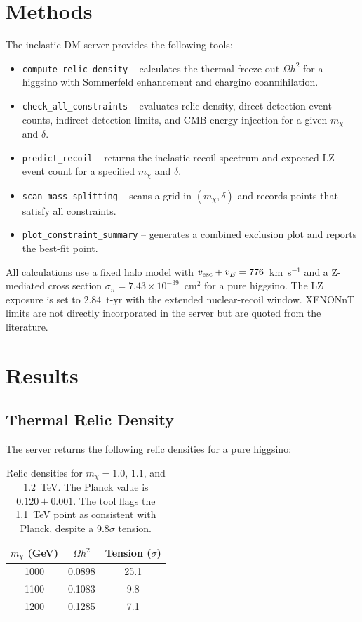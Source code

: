 \documentclass[11pt,a4paper]{article}
\begin{document}
\section{Methods}
The inelastic-DM server provides the following tools:
\begin{itemize}
\item \texttt{compute\_relic\_density} -- calculates the thermal freeze-out $\Omega h^2$ for a higgsino with Sommerfeld enhancement and chargino coannihilation.
\item \texttt{check\_all\_constraints} -- evaluates relic density, direct-detection event counts, indirect-detection limits, and CMB energy injection for a given $m_\chi$ and $\delta$.
\item \texttt{predict\_recoil} -- returns the inelastic recoil spectrum and expected LZ event count for a specified $m_\chi$ and $\delta$.
\item \texttt{scan\_mass\_splitting} -- scans a grid in $(m_\chi,\delta)$ and records points that satisfy all constraints.
\item \texttt{plot\_constraint\_summary} -- generates a combined exclusion plot and reports the best-fit point.
\end{itemize}
All calculations use a fixed halo model with $v_{\rm esc}+v_E=776$~km~s$^{-1}$ and a Z-mediated cross section $\sigma_n=7.43\times10^{-39}$~cm$^2$ for a pure higgsino.  The LZ exposure is set to $2.84$~t-yr with the extended nuclear-recoil window.  XENONnT limits are not directly incorporated in the server but are quoted from the literature.

\section{Results}
\subsection{Thermal Relic Density}
The server returns the following relic densities for a pure higgsino:
\begin{table}[h]
\centering
\begin{tabular}{c|c|c}
$m_\chi$ (GeV) & $\Omega h^2$ & Tension ($\sigma$)\\ \hline
1000 & 0.0898 & 25.1\\
1100 & 0.1083 & 9.8\\
1200 & 0.1285 & 7.1
\end{tabular}
\caption{Relic densities for $m_\chi=1.0$, $1.1$, and $1.2$~TeV.  The Planck value is $0.120\pm0.001$.  The tool flags the 1.1~TeV point as consistent with Planck, despite a $9.8\sigma$ tension.}
\end{table}
\end{document}
